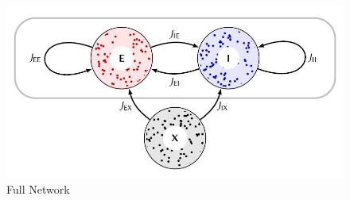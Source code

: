 \documentclass[twoside,twocolumn]{article}
\begin{document}
\begin{figure}[h]
  \centering
    \includegraphics[width=\linewidth]{network}
  \caption{Full Network}
  \label{fig:net}
\end{figure}
\end{document}
